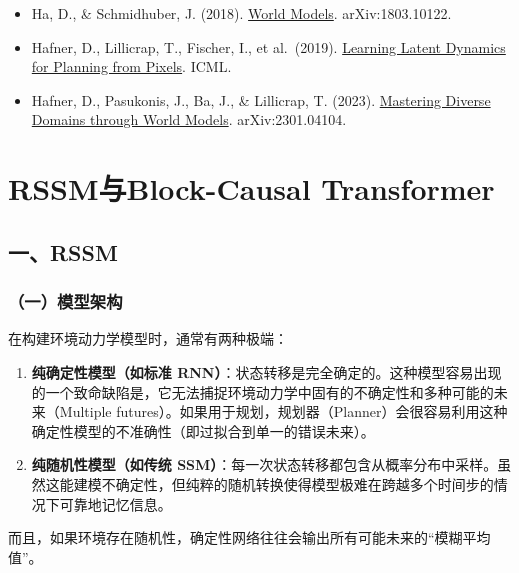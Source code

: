 \begin{itemize}
\tightlist
\item
  Ha, D., \& Schmidhuber, J. (2018). \href{https://arxiv.org/abs/1803.10122}{World Models}. arXiv:1803.10122.
\item
  Hafner, D., Lillicrap, T., Fischer, I., et al.~(2019). \href{https://arxiv.org/abs/1811.04551}{Learning Latent Dynamics for Planning from Pixels}. ICML.
\item
  Hafner, D., Pasukonis, J., Ba, J., \& Lillicrap, T. (2023). \href{https://arxiv.org/abs/2301.04104}{Mastering Diverse Domains through World Models}. arXiv:2301.04104.
\end{itemize}

\clearpage

\hypertarget{rssmux4e0eblock-causal-transformer}{%
\section{RSSM与Block-Causal Transformer}\label{rssmux4e0eblock-causal-transformer}}

\hypertarget{ux4e00rssm}{%
\subsection{一、RSSM}\label{ux4e00rssm}}

\hypertarget{ux4e00ux6a21ux578bux67b6ux6784}{%
\subsubsection{（一）模型架构}\label{ux4e00ux6a21ux578bux67b6ux6784}}

在构建环境动力学模型时，通常有两种极端：

\begin{enumerate}
\def\labelenumi{\arabic{enumi}.}
\item
  \textbf{纯确定性模型（如标准 RNN）}：状态转移是完全确定的。这种模型容易出现的一个致命缺陷是，它无法捕捉环境动力学中固有的不确定性和多种可能的未来（Multiple futures）。如果用于规划，规划器（Planner）会很容易利用这种确定性模型的不准确性（即过拟合到单一的错误未来）。
\item
  \textbf{纯随机性模型（如传统 SSM）}：每一次状态转移都包含从概率分布中采样。虽然这能建模不确定性，但纯粹的随机转换使得模型极难在跨越多个时间步的情况下可靠地记忆信息。
\end{enumerate}

而且，如果环境存在随机性，确定性网络往往会输出所有可能未来的``模糊平均值''。

